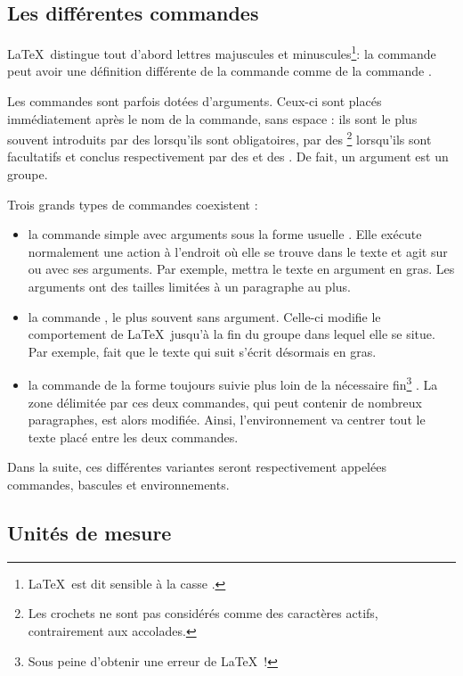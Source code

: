 \subsection{Les différentes commandes}

\LaTeX\ distingue tout d'abord lettres majuscules et minuscules\footnote{\LaTeX\ est dit \og sensible à la casse \fg{}.}: la commande  peut avoir une définition différente de la commande  comme de la commande . 

Les commandes sont parfois dotées d'arguments. Ceux-ci sont placés immédiatement après le nom de la commande, sans espace : ils sont le plus souvent introduits par des \macron{\{} lorsqu'ils sont obligatoires, par des \macron{[}\footnote{Les crochets ne sont pas considérés comme des caractères actifs, contrairement aux accolades.} lorsqu'ils sont facultatifs et conclus respectivement par des \macron{\}} et des \macron{]}. De fait, un argument est un groupe.

Trois grands types de commandes coexistent :
\begin{itemize}
\item la commande simple avec arguments sous la forme usuelle . Elle exécute normalement une action à l'endroit où elle se trouve dans le texte et agit sur ou avec ses arguments. Par exemple,   mettra le texte en argument en gras. Les arguments ont des tailles limitées à un paragraphe au plus.
\item la commande , le plus souvent sans argument. Celle-ci modifie le comportement de \LaTeX\ jusqu'à la fin du groupe dans lequel elle se situe. Par exemple,  fait que le texte qui suit s'écrit désormais en gras. 
\item la commande  de la forme  toujours suivie plus loin de la nécessaire fin\footnote{Sous peine d'obtenir une erreur de \LaTeX\ !} . La zone délimitée par ces deux commandes, qui peut contenir de nombreux paragraphes, est alors modifiée. Ainsi, l'environnement  va centrer tout le texte placé entre les deux commandes.
\end{itemize}

Dans la suite, ces différentes variantes seront respectivement appelées commandes, bascules et environnements.

\subsection{Unités de mesure}\label{unite}

